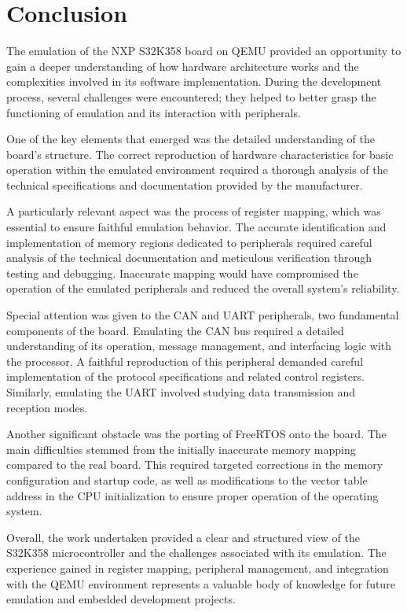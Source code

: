 \section{Conclusion}

The emulation of the NXP S32K358 board on QEMU provided an opportunity to gain a deeper understanding of how hardware architecture works and the complexities involved in its software implementation. During the development process, several challenges were encountered; they helped to better grasp the functioning of emulation and its interaction with peripherals.

One of the key elements that emerged was the detailed understanding of the board's structure. The correct reproduction of hardware characteristics for basic operation within the emulated environment required a thorough analysis of the technical specifications and documentation provided by the manufacturer. 

A particularly relevant aspect was the process of register mapping, which was essential to ensure faithful emulation behavior. The accurate identification and implementation of memory regions dedicated to peripherals required careful analysis of the technical documentation and meticulous verification through testing and debugging. Inaccurate mapping would have compromised the operation of the emulated peripherals and reduced the overall system's reliability.

Special attention was given to the CAN and UART peripherals, two fundamental components of the board. Emulating the CAN bus required a detailed understanding of its operation, message management, and interfacing logic with the processor. A faithful reproduction of this peripheral demanded careful implementation of the protocol specifications and related control registers. Similarly, emulating the UART involved studying data transmission and reception modes.

Another significant obstacle was the porting of FreeRTOS onto the board. The main difficulties stemmed from the initially inaccurate memory mapping compared to the real board. This required targeted corrections in the memory configuration and startup code, as well as modifications to the vector table address in the CPU initialization to ensure proper operation of the operating system.

Overall, the work undertaken provided a clear and structured view of the S32K358 microcontroller and the challenges associated with its emulation. The experience gained in register mapping, peripheral management, and integration with the QEMU environment represents a valuable body of knowledge for future emulation and embedded development projects.

